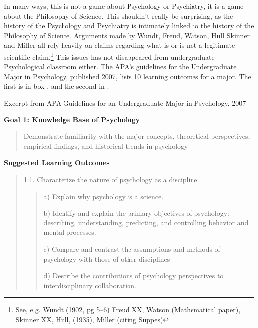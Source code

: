 \begin{refsection}
In many ways, this is not a game about Psychology or Psychiatry, it is a game about the Philosophy of Science. This shouldn't really be surprising, as the history of the Psychology and Psychiatry is intimately linked to the history of the Philosophy of Science. Arguments made by Wundt, Freud, Watson, Hull Skinner and Miller all rely heavily on claims regarding what is or is not a legitimate scientific claim.\footnote{See, e.g. Wundt (1902, pg 5--6) Freud XX, Watson (Mathematical paper), Skinner XX, Hull, (1935), Miller (citing Suppes)} This issues has not disappeared from undergraduate Psychological classroom either. The APA's guidelines for the Undergraduate Major in Psychology, published 2007, lists 10 learning outcomes for a major. The first is in box , and the second in .

\begin{apatextbox}{Excerpt from APA Guidelines for an Undergraduate Major in Psychology, 2007}

\textbf{Goal 1: Knowledge Base of Psychology}

\begin{quote}

Demonstrate familiarity with the major concepts, theoretical perspectives, empirical findings, and historical trends in psychology
\end{quote}

\textbf{Suggested Learning Outcomes}

\begin{quote}

1.1. Characterize the nature of psychology as a discipline

\begin{quote}

a) Explain why psychology is a science.

b) Identify and explain the primary objectives of psychology: describing, understanding, predicting, and controlling behavior and mental processes.

c) Compare and contrast the assumptions and methods of psychology with those of other disciplines

d) Describe the contributions of psychology perspectives to interdisciplinary collaboration.
\end{quote}
\end{quote}

\label{excerptfromapaguidelinesforanundergraduatemajorinpsychology2007}\end{apatextbox}


\end{refsection}
